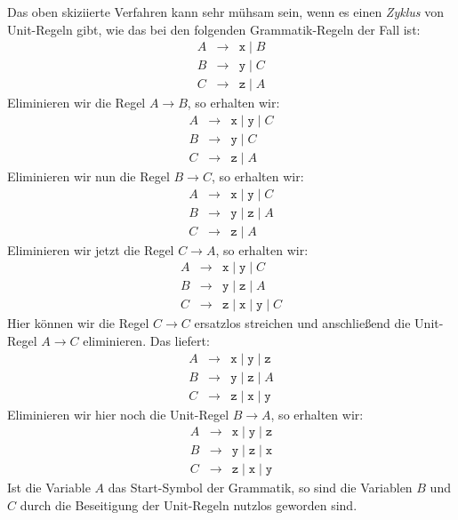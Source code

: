 Das oben skiziierte Verfahren kann sehr m\"uhsam sein, wenn es einen \emph{Zyklus} von
Unit-Regeln gibt, wie das bei den folgenden Grammatik-Regeln der Fall
ist:
\begin{eqnarray*}
  A & \rightarrow & \texttt{x} \mid B \\[0.1cm]
  B & \rightarrow & \texttt{y} \mid C \\[0.1cm]
  C & \rightarrow & \texttt{z} \mid A          
\end{eqnarray*}
Eliminieren wir die Regel $A \rightarrow B$, so erhalten wir:
\begin{eqnarray*}
  A & \rightarrow & \texttt{x} \mid \texttt{y} \mid C \\[0.1cm]
  B & \rightarrow & \texttt{y} \mid C          \\[0.1cm]
  C & \rightarrow & \texttt{z} \mid A          
\end{eqnarray*}
Eliminieren wir nun die Regel $B \rightarrow C$, so erhalten wir:
\begin{eqnarray*}
  A & \rightarrow & \texttt{x} \mid \texttt{y} \mid C \\[0.1cm]
  B & \rightarrow & \texttt{y} \mid \texttt{z} \mid A \\[0.1cm]
  C & \rightarrow & \texttt{z} \mid A          
\end{eqnarray*}
Eliminieren wir jetzt die Regel $C \rightarrow A$, so erhalten wir:
\begin{eqnarray*}
  A & \rightarrow & \texttt{x} \mid \texttt{y} \mid C \\[0.1cm]
  B & \rightarrow & \texttt{y} \mid \texttt{z} \mid A \\[0.1cm]
  C & \rightarrow & \texttt{z} \mid \texttt{x} \mid \texttt{y} \mid C
\end{eqnarray*}
Hier k\"onnen wir die Regel $C \rightarrow C$ ersatzlos streichen und anschlie{\ss}end die 
Unit-Regel $A \rightarrow C$ eliminieren.  Das liefert:
\begin{eqnarray*}
  A & \rightarrow & \texttt{x} \mid \texttt{y} \mid \texttt{z}  \\[0.1cm]
  B & \rightarrow & \texttt{y} \mid \texttt{z} \mid A \\[0.1cm]
  C & \rightarrow & \texttt{z} \mid \texttt{x} \mid \texttt{y} 
\end{eqnarray*}
Eliminieren wir hier noch die Unit-Regel $B \rightarrow A$, so erhalten
wir:
\begin{eqnarray*}
  A & \rightarrow & \texttt{x} \mid \texttt{y} \mid \texttt{z}  \\[0.1cm]
  B & \rightarrow & \texttt{y} \mid \texttt{z} \mid \texttt{x} \\[0.1cm]
  C & \rightarrow & \texttt{z} \mid \texttt{x} \mid \texttt{y} 
\end{eqnarray*}
Ist die Variable $A$ das Start-Symbol der Grammatik, so sind die Variablen
$B$ und $C$ durch die Beseitigung der Unit-Regeln nutzlos geworden sind.

